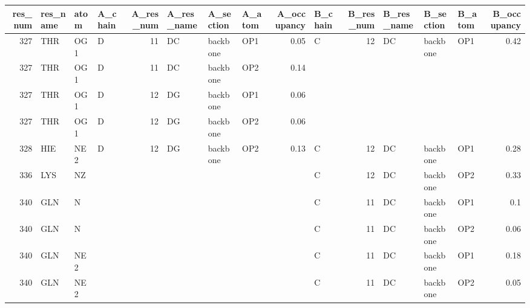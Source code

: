 \begin{longtable}{rlllrlllrlrlllr}
\hline
   res\_num & res\_name   & atom   & A\_chain   &   A\_res\_num & A\_res\_name   & A\_section   & A\_atom   &   A\_occupancy & B\_chain   &   B\_res\_num & B\_res\_name   & B\_section   & B\_atom   &   B\_occupancy \\
\hline
\endhead
       327 & THR        & OG1    & D         &          11 & DC           & backbone    & OP1      &          0.05 & C         &          12 & DC           & backbone    & OP1      &          0.42 \\
       327 & THR        & OG1    & D         &          11 & DC           & backbone    & OP2      &          0.14 &        &          &           &          &       &            \\
       327 & THR        & OG1    & D         &          12 & DG           & backbone    & OP1      &          0.06 &        &          &           &          &       &            \\
       327 & THR        & OG1    & D         &          12 & DG           & backbone    & OP2      &          0.06 &        &          &           &          &       &            \\
       328 & HIE        & NE2    & D         &          12 & DG           & backbone    & OP2      &          0.13 & C         &          12 & DC           & backbone    & OP1      &          0.28 \\
       336 & LYS        & NZ     &        &          &           &          &       &            & C         &          12 & DC           & backbone    & OP2      &          0.33 \\
       340 & GLN        & N      &        &          &           &          &       &            & C         &          11 & DC           & backbone    & OP1      &          0.1  \\
       340 & GLN        & N      &        &          &           &          &       &            & C         &          11 & DC           & backbone    & OP2      &          0.06 \\
       340 & GLN        & NE2    &        &          &           &          &       &            & C         &          11 & DC           & backbone    & OP1      &          0.18 \\
       340 & GLN        & NE2    &        &          &           &          &       &            & C         &          11 & DC           & backbone    & OP2      &          0.05 \\

\end{longtable}
